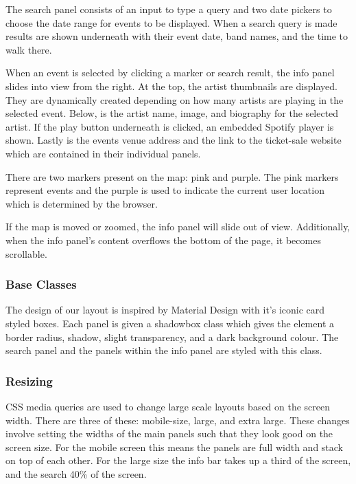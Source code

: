 \documentclass[10pt]{article}
\begin{document}
                The search panel consists of an input to type a query and two date pickers to choose the date range for events to be displayed. When a search query is made results are shown underneath with their event date, band names, and the time to walk there.

                When an event is selected by clicking a marker or search result, the info panel slides into view from the right. At the top, the artist thumbnails are displayed. They are dynamically created depending on how many artists are playing in the selected event. Below, is the artist name, image, and biography for the selected artist. If the play button underneath is clicked, an embedded Spotify player is shown. Lastly is the events venue address and the link to the ticket-sale website which are contained in their individual panels.

                There are two markers present on the map: pink and purple. The pink markers represent events and the purple is used to indicate the current user location which is determined by the browser.

               If the map is moved or zoomed, the info panel will slide out of view. Additionally, when the info panel's content overflows the bottom of the page, it becomes scrollable.


            \subsubsection{Base Classes}
                The design of our layout is inspired by Material Design with it's iconic card styled boxes. Each panel is given a shadowbox class which gives the element a border radius, shadow, slight transparency, and a dark background colour. The search panel and the panels within the info panel are styled with this class.

            \subsubsection{Resizing}
                CSS media queries are used to change large scale layouts based on the screen width. There are three of these: mobile-size, large, and extra large. These changes involve setting the widths of the main panels such that they look good on the screen size. For the mobile screen this means the panels are full width and stack on top of each other. For the large size the info bar takes up a third of the screen, and the search 40\% of the screen.
\end{document}

